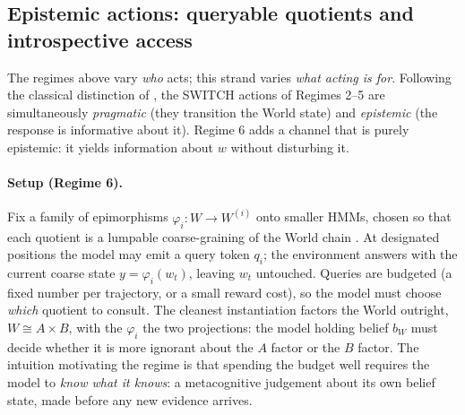 
\subsection*{Epistemic actions: queryable quotients and introspective access}

The regimes above vary \emph{who} acts; this strand varies \emph{what acting is
for}. Following the classical distinction of \citep{kirsh1994epistemic}, the
SWITCH actions of Regimes 2--5 are simultaneously \emph{pragmatic} (they
transition the World state) and \emph{epistemic} (the response is informative
about it). Regime 6 adds a channel that is purely epistemic: it yields
information about $w$ without disturbing it.

\paragraph{Setup (Regime 6).} Fix a family of epimorphisms
$\varphi_i : W \to W^{(i)}$ onto smaller HMMs, chosen so that each quotient is a
lumpable coarse-graining of the World chain \citep{kemeny1960finite}. At
designated positions the model may emit a query token $q_i$; the environment
answers with the current coarse state $y = \varphi_i(w_t)$, leaving $w_t$
untouched. Queries are budgeted (a fixed number per trajectory, or a small
reward cost), so the model must choose \emph{which} quotient to consult. The
cleanest instantiation factors the World outright, $W \cong A \times B$, with
the $\varphi_i$ the two projections: the model holding belief $b_W$ must decide
whether it is more ignorant about the $A$ factor or the $B$ factor. The
intuition motivating the regime is that spending the budget well requires the
model to \emph{know what it knows}: a metacognitive judgement about its own
belief state, made before any new evidence arrives.

